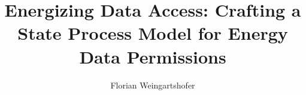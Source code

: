 \documentclass[sigconf]{acmart}
\begin{document}
    \title{Energizing Data Access: Crafting a State Process Model for Energy Data Permissions}

    \author{Florian Weingartshofer}

    

    \maketitle

    
    
    
    

%    
%    
\end{document}
